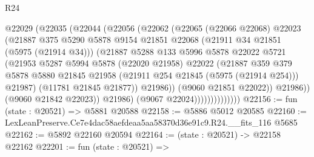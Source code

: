 \begin{lexlean}{R24}
\begin{coremodule}
                            @22029
                              (@22035
                                (@22044
                                  (@22056
                                    (@22062
                                      (@22065
                                        (@22066 @22068)
                                        @22023
                                        (@21887
                                          @375
                                          @5290
                                          @5878
                                          @9154
                                          @21851
                                          @22068
                                          (@21911 @34 @21851 (@5975 (@21914 @34)))
                                          (@21887
                                            @5288
                                            @133
                                            @5996
                                            @5878
                                            @22022
                                            @5721
                                            (@21953
                                              @5287
                                              @5994
                                              @5878
                                              (@22020 @21958)
                                              @22022
                                              (@21887
                                                @359
                                                @379
                                                @5878
                                                @5880
                                                @21845
                                                @21958
                                                (@21911 @254 @21845 (@5975 (@21914 @254)))
                                                @21987)
                                              (@11781 @21845 @21877))
                                            @21986))
                                        (@9060 @21851 @22022))
                                      @21986))
                                  (@9060 @21842 @22023))
                                @21986)
                              (@9067 @22024))))))))))))))
@22156 := fun (state : @20521) => @5881 @20588
@22158 := @5886 @5012 @20585
@22160 := LexLeanPreserve.Ce7e4dac58aefdeaa5aa58370d36e91c9.R24.__fits_116 @5685
@22162 := @5892 @22160 @20594
@22164 := (state : @20521) -> @22158 @22162
@22201 := fun (state : @20521) =>

\end{coremodule}
\end{lexlean}
